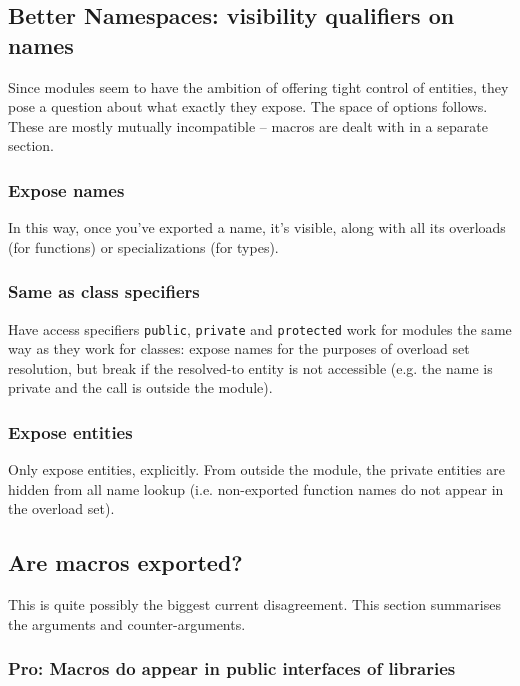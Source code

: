 \documentclass[reqno]{article}
\begin{document}
\subsection{Better Namespaces: visibility qualifiers on names}

Since modules seem to have the ambition of offering tight control of entities,
they pose a question about what exactly they expose. The space of options
follows. These are mostly mutually incompatible -- macros are dealt with in a
separate section.


\subsubsection{Expose names}

In this way, once you've exported a name, it's visible, along with all its
overloads (for functions) or specializations (for types).


\subsubsection{Same as class specifiers}

Have access specifiers \texttt{public}, \texttt{private} and \texttt{protected}
work for modules the same way as they work for classes: expose names for the
purposes of overload set resolution, but break if the resolved-to entity is
not accessible (e.g. the name is private and the call is outside the module).


\subsubsection{Expose entities}

Only expose entities, explicitly. From outside the module, the private entities
are hidden from all name lookup (i.e. non-exported function names do not appear
in the overload set).


\subsection{Are macros exported?}

This is quite possibly the biggest current disagreement. This section summarises
the arguments and counter-arguments.


\subsubsection{Pro: Macros do appear in public interfaces of libraries}
\end{document}
